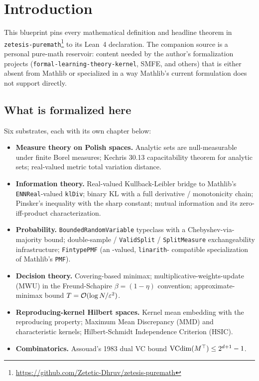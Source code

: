 \chapter{Introduction}\label{chap:intro}

This blueprint pins every mathematical definition and headline theorem in
\texttt{zetesis-puremath}\footnote{\url{https://github.com/Zetetic-Dhruv/zetesis-puremath}}
to its Lean~4 declaration. The companion source is a personal pure-math
reservoir: content needed by the author's formalization projects
(\texttt{formal-learning-theory-kernel}, SMFE, and others) that is either
absent from Mathlib or specialized in a way Mathlib's current formulation
does not support directly.

\section{What is formalized here}

Six substrates, each with its own chapter below:

\begin{itemize}
  \item \textbf{Measure theory on Polish spaces.} Analytic sets are
    null-measurable under finite Borel measures; Kechris 30.13
    capacitability theorem for analytic sets;
    real-valued metric total variation distance.
  \item \textbf{Information theory.} Real-valued Kullback-Leibler bridge
    to Mathlib's \texttt{ENNReal}-valued \texttt{klDiv}; binary KL with a
    full derivative / monotonicity chain; Pinsker's inequality with the
    sharp constant; mutual information and its zero-iff-product
    characterization.
  \item \textbf{Probability.} \texttt{BoundedRandomVariable} typeclass
    with a Chebyshev-via-majority bound; double-sample /
    \texttt{ValidSplit} / \texttt{SplitMeasure} exchangeability
    infrastructure; \texttt{FintypePMF} (an \R-valued, \texttt{linarith}-
    compatible specialization of Mathlib's \texttt{PMF}).
  \item \textbf{Decision theory.} Covering-based minimax;
    multiplicative-weights-update (MWU) in the Freund-Schapire
    $\beta = (1-\eta)$ convention; approximate-minimax bound
    $T = \mathcal{O}(\log N / \varepsilon^2)$.
  \item \textbf{Reproducing-kernel Hilbert spaces.} Kernel mean
    embedding with the reproducing property; Maximum Mean Discrepancy
    (MMD) and characteristic kernels; Hilbert-Schmidt Independence
    Criterion (HSIC).
  \item \textbf{Combinatorics.} Assouad's 1983 dual VC bound
    $\mathrm{VCdim}(M^\top) \le 2^{d+1} - 1$.
\end{itemize}


